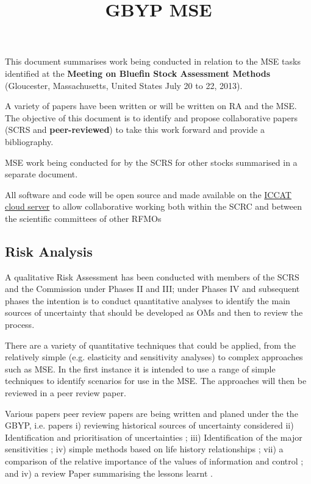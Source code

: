 \documentclass[a4paper,10pt]{article}
\title{GBYP MSE}
\begin{document}
\maketitle

This document summarises work being conducted in relation to the \gls{MSE} tasks identified at the  
\textbf{Meeting on Bluefin Stock Assessment Methods} (Gloucester, Massachusetts, United States July 20 to 22, 2013).

A variety of papers have been written or will be written on \gls{RA} and the MSE.  The objective of this document is to identify and propose collaborative 
papers (SCRS and \textbf{peer-reviewed}) to take this work forward and provide a bibliography.

MSE work being conducted for by the SCRS for other stocks summarised in a separate document.

All software and code will be open source and made available on the \href{http://rscloud.iccat.int}{ICCAT cloud server} to 
allow collaborative working both within the SCRC and between the scientific committees of other \glspl{RFMO}

\tableofcontents

\subsection{Risk Analysis}

A qualitative Risk Assessment has been conducted with members of the SCRS and the Commission under
Phases II and III; under Phases IV and subsequent phases the intention is to conduct quantitative analyses
to identify the main sources of uncertainty that should be developed as \glspl{OM} and 
then to review the process.

There are a variety of quantitative techniques that could be applied, from the relatively simple (e.g. elasticity and sensitivity analyses)
to complex approaches such as MSE. In the first instance it is intended to use a range of simple techniques to identify scenarios for use in the 
MSE. The approaches will then be reviewed in a peer review paper. 

Various papers peer review papers are being written and planed under the the GBYP, i.e.
papers i) reviewing historical sources of uncertainty considered 
ii) Identification and prioritisation of uncertainties ;
iii) Identification of the major sensitivities ; iv)  
simple methods based on life history relationships ;
vii) a comparison of the relative importance of the values of information and control ; and 
iv) a review Paper summarising the lessons learnt .
\end{document}
